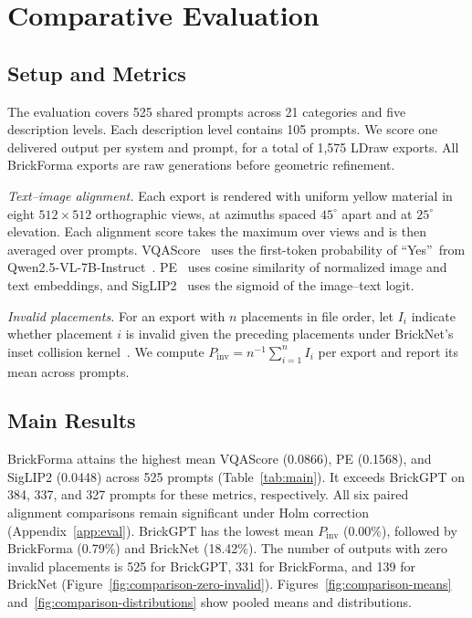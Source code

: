 \documentclass[letterpaper]{article} %
\begin{document}
\section{Comparative Evaluation}
\label{sec:eval}
\subsection{Setup and Metrics}
\label{sec:setup}
The evaluation covers 525 shared prompts across 21 categories and five description levels. Each description level contains 105 prompts. We score one delivered output per system and prompt, for a total of 1,575 LDraw exports. All BrickForma exports are raw generations before geometric refinement.


\emph{Text--image alignment.}
Each export is rendered with uniform yellow material in eight $512{\times}512$ orthographic views, at azimuths spaced $45^\circ$ apart and at $25^\circ$ elevation. Each alignment score takes the maximum over views and is then averaged over prompts. VQAScore~\cite{vqascore} uses the first-token probability of \textquotedblleft Yes\textquotedblright\ from Qwen2.5-VL-7B-Instruct~\cite{qwen25vl}. PE~\cite{pe} uses cosine similarity of normalized image and text embeddings, and SigLIP2~\cite{siglip2} uses the sigmoid of the image--text logit.

\emph{Invalid placements.}
For an export with $n$ placements in file order, let $I_i$ indicate whether placement $i$ is invalid given the preceding placements under BrickNet's inset collision kernel~\cite{bricknet}. We compute $P_{\mathrm{inv}}=n^{-1}\sum_{i=1}^{n}I_i$ per export and report its mean across prompts.

\subsection{Main Results}

BrickForma attains the highest mean VQAScore (0.0866), PE (0.1568), and SigLIP2 (0.0448) across 525 prompts (Table~\ref{tab:main}). It exceeds BrickGPT on 384, 337, and 327 prompts for these metrics, respectively. All six paired alignment comparisons remain significant under Holm correction (Appendix~\ref{app:eval}). BrickGPT has the lowest mean $P_{\mathrm{inv}}$ (0.00\%), followed by BrickForma (0.79\%) and BrickNet (18.42\%). The number of outputs with zero invalid placements is 525 for BrickGPT, 331 for BrickForma, and 139 for BrickNet (Figure~\ref{fig:comparison-zero-invalid}). Figures~\ref{fig:comparison-means} and~\ref{fig:comparison-distributions} show pooled means and distributions.
\end{document}
